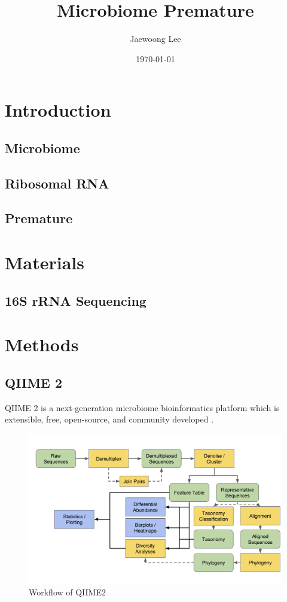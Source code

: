\documentclass[11pt, a4paper]{article}
\title{Microbiome Premature}
\author{Jaewoong Lee}
\date{\today}
\begin{document}
   	\maketitle
    \newpage

    \tableofcontents
    \listoftables
    \listoffigures
    \newpage

    \section{Introduction}
        \subsection{Microbiome}

        \subsection[rRNA]{Ribosomal RNA}

        \subsection{Premature}

    \section{Materials}
        \subsection{16S rRNA Sequencing}

    \section{Methods}
        \subsection{QIIME 2}
            QIIME 2 is a next-generation microbiome bioinformatics platform which is extensible, free, open-source, and community developed \cite{qiime1, qiime2, qiime3}.

            \begin{figure}[htbp]
                \centering
                \includegraphics[width=0.6 \linewidth]{figures/qiime.png}
                \caption{Workflow of QIIME2}
                \label{fig:qiime2}
            \end{figure}
\end{document}
